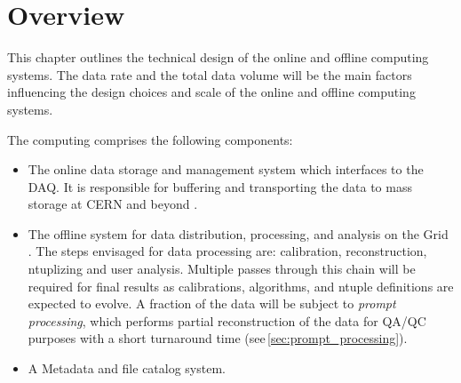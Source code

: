 \section{Overview}



This chapter outlines  the technical design of the online and offline computing systems.
The data rate and the total data volume will be the main factors influencing the design choices and scale of the \pd
online and offline computing systems.   

The \pd computing comprises the following components: 
\begin{itemize}

\item The online data storage and management system which interfaces to the DAQ. It is responsible for buffering
and transporting the data to mass storage at CERN and beyond \cite{comp_model}.

\item The offline system for data distribution, processing, and analysis on the Grid \cite{data_managm_sys}.  
The steps envisaged for data processing are: 
calibration, reconstruction, ntuplizing and user analysis.  Multiple passes through this chain will be required for final results as
calibrations, algorithms, and ntuple definitions are expected to evolve.
A fraction of the data will be subject to \textit{prompt processing}, which performs partial reconstruction of the data for QA/QC purposes
with a short turnaround time (see\,\ref{sec:prompt_processing}).

\item  A Metadata and file catalog system.
\end{itemize}
